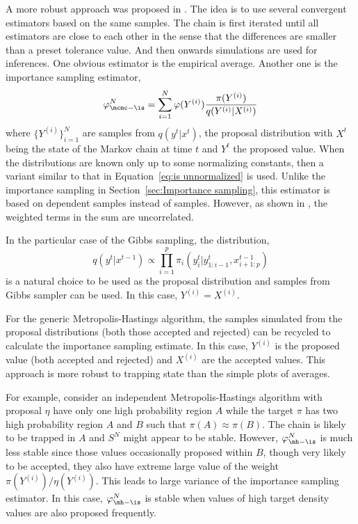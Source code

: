A more robust approach was proposed in \cite{Robert:1995ge}. The idea is to
use several convergent estimators based on the same samples. The chain is
first iterated until all estimators are close to each other in the sense that
the differences are smaller than a preset tolerance value. And then onwards
simulations are used for inferences. One obvious estimator is the empirical
average. Another one is the importance sampling estimator,
\begin{equation}
  \varphi_{\mcmc-\is}^N
  = \sum_{i=1}^N \varphi(Y^{(i)})\frac{\pi(Y^{(i)})}{q(Y^{(i)}|X^{(i)})}
  \label{eq:sn is}
\end{equation}
where $\{Y^{(i)}\}_{i=1}^N$ are samples from $q(y^t|x^t)$, the proposal
distribution with $X^t$ being the state of the Markov chain at time $t$ and
$Y^t$ the proposed value. When the distributions are known only up to some
normalizing constants, then a variant similar to that in Equation~\eqref{eq:is
  unnormalized} is used. Unlike the importance sampling in
Section~\ref{sec:Importance sampling}, this estimator is based on dependent
samples instead of \iid samples. However, as shown in
\cite[][Lemma~12.11]{Robert:2004tn}, the weighted terms in the sum are
uncorrelated.


In the particular case of the Gibbs sampling, the distribution,
\begin{equation}
  q(y^t|x^{t-1}) \propto \prod_{i=1}^p \pi_i(y_i^t|y_{1:i-1}^t,x_{i+1:p}^{t-1})
\end{equation}
is a natural choice to be used as the proposal distribution and samples from
Gibbs sampler can be used. In this case, $Y^{(i)} = X^{(i)}$.

For the generic Metropolis-Hastings algorithm, the samples simulated from the
proposal distributions (both those accepted and rejected) can be recycled to
calculate the importance sampling estimate. In this case, $Y^{(i)}$ is the
proposed value (both accepted and rejected) and $X^{(i)}$ are the accepted
values. This approach is more robust to trapping state than the simple plots
of averages.

For example, consider an independent Metropolis-Hastings algorithm with
proposal $\eta$ have only one high probability region $A$ while the target
$\pi$ has two high probability region $A$ and $B$ such that
$\pi(A)\approx\pi(B)$. The chain is likely to be trapped in $A$ and $S^N$
might appear to be stable. However, $\varphi_{\mh-\is}^N$ is much less stable
since those values occasionally proposed within $B$, though very likely to be
accepted, they also have extreme large value of the weight
$\pi(Y^{(i)})/\eta(Y^{(i)})$. This leads to large variance of the importance
sampling estimator. In this case, $\varphi_{\mh-\is}^N$ is stable when values
of high target density values are also proposed frequently.

